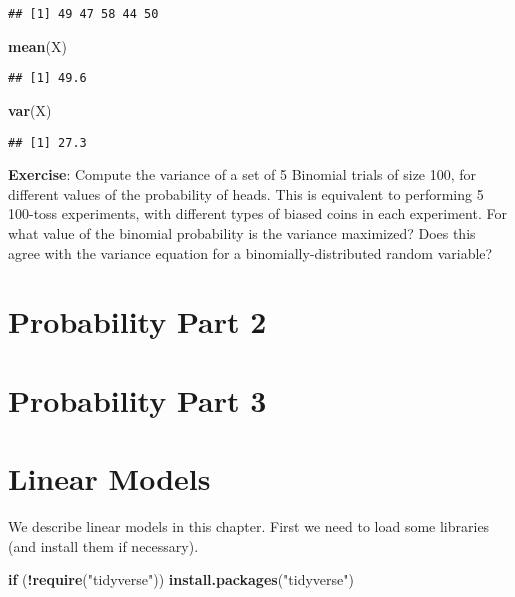 \documentclass[
]{book}
\newenvironment{Shaded}{\begin{snugshade}}{\end{snugshade}}
\newcommand{\ControlFlowTok}[1]{\textcolor[rgb]{0.13,0.29,0.53}{\textbf{#1}}}
\newcommand{\KeywordTok}[1]{\textcolor[rgb]{0.13,0.29,0.53}{\textbf{#1}}}
\newcommand{\NormalTok}[1]{#1}
\newcommand{\OperatorTok}[1]{\textcolor[rgb]{0.81,0.36,0.00}{\textbf{#1}}}
\newcommand{\StringTok}[1]{\textcolor[rgb]{0.31,0.60,0.02}{#1}}
\begin{document}
\begin{verbatim}
## [1] 49 47 58 44 50
\end{verbatim}

\begin{Shaded}
\begin{Highlighting}[]
\KeywordTok{mean}\NormalTok{(X)}
\end{Highlighting}
\end{Shaded}

\begin{verbatim}
## [1] 49.6
\end{verbatim}

\begin{Shaded}
\begin{Highlighting}[]
\KeywordTok{var}\NormalTok{(X)}
\end{Highlighting}
\end{Shaded}

\begin{verbatim}
## [1] 27.3
\end{verbatim}

\textbf{Exercise}: Compute the variance of a set of 5 Binomial trials of size 100, for different values of the probability of heads. This is equivalent to performing 5 100-toss experiments, with different types of biased coins in each experiment. For what value of the binomial probability is the variance maximized? Does this agree with the variance equation for a binomially-distributed random variable?

\hypertarget{probability-part-2}{%
\chapter{Probability Part 2}\label{probability-part-2}}

\hypertarget{probability-part-3}{%
\chapter{Probability Part 3}\label{probability-part-3}}

\hypertarget{linear-models}{%
\chapter{Linear Models}\label{linear-models}}

We describe linear models in this chapter. First we need to load some libraries (and install them if necessary).

\begin{Shaded}
\begin{Highlighting}[]
\ControlFlowTok{if}\NormalTok{ (}\OperatorTok{!}\KeywordTok{require}\NormalTok{(}\StringTok{"tidyverse"}\NormalTok{)) }\KeywordTok{install.packages}\NormalTok{(}\StringTok{"tidyverse"}\NormalTok{)}
\end{Highlighting}
\end{Shaded}
\end{document}
